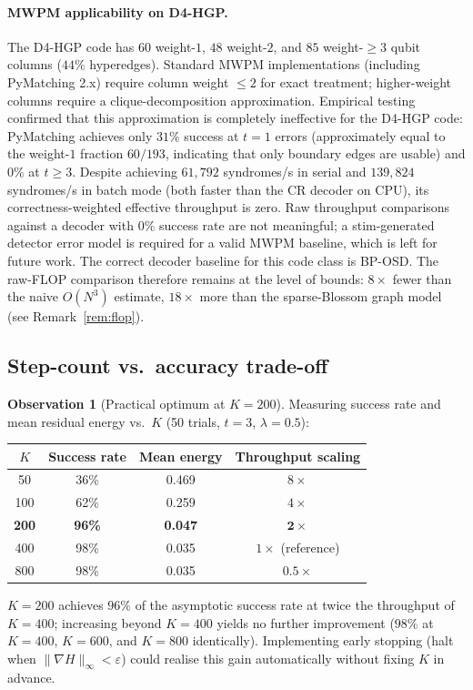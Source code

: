 \documentclass[12pt,a4paper]{article}
\theoremstyle{plain}
\theoremstyle{definition}
\newtheorem{observation}[theorem]{Observation}
\theoremstyle{remark}
\begin{document}
\paragraph{MWPM applicability on D4-HGP.}
The D4-HGP code has $60$ weight-$1$, $48$ weight-$2$, and $85$
weight-$\geq 3$ qubit columns ($44\%$ hyperedges).
Standard MWPM implementations (including PyMatching 2.x) require column
weight $\leq 2$ for exact treatment; higher-weight columns require a
clique-decomposition approximation.
Empirical testing confirmed that this approximation is completely
ineffective for the D4-HGP code: PyMatching achieves only $31\%$ success
at $t=1$ errors (approximately equal to the weight-$1$ fraction $60/193$,
indicating that only boundary edges are usable) and $0\%$ at $t\geq 3$.
Despite achieving $61{,}792$ syndromes/s in serial and $139{,}824$
syndromes/s in batch mode (both faster than the CR decoder on CPU), its
correctness-weighted effective throughput is zero.
Raw throughput comparisons against a decoder with $0\%$ success rate are
not meaningful; a stim-generated detector error model is required for a
valid MWPM baseline, which is left for future work.
The correct decoder baseline for this code class is BP-OSD.
The raw-FLOP comparison therefore remains at the level of bounds:
$8\times$ fewer than the naive $O(N^3)$ estimate, $18\times$ more than
the sparse-Blossom graph model (see Remark~\ref{rem:flop}).

\subsection{Step-count vs.\ accuracy trade-off}

\begin{observation}[Practical optimum at $K=200$]\label{obs:kopt}
Measuring success rate and mean residual energy vs.\ $K$ (50 trials,
$t=3$, $\lambda=0.5$):

\begin{center}
\begin{tabular}{cccc}
\toprule
$K$ & Success rate & Mean energy & Throughput scaling \\
\midrule
50 & 36\% & 0.469 & $8\times$ \\
100 & 62\% & 0.259 & $4\times$ \\
\textbf{200} & \textbf{96\%} & \textbf{0.047} & $\bm{2\times}$ \\
400 & 98\% & 0.035 & $1\times$ (reference) \\
800 & 98\% & 0.035 & $0.5\times$ \\
\bottomrule
\end{tabular}
\end{center}

$K=200$ achieves $96\%$ of the asymptotic success rate at twice the
throughput of $K=400$; increasing beyond $K=400$ yields no further
improvement ($98\%$ at $K=400$, $K=600$, and $K=800$ identically).
Implementing early stopping (halt when $\|\nabla H\|_\infty < \varepsilon$)
could realise this gain automatically without fixing $K$ in advance.
\end{observation}
\end{document}
